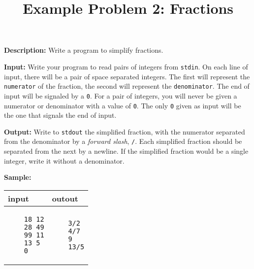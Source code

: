 \documentclass[a4paper]{article}
\title{Example Problem 2: Fractions}
\begin{document}
\lstset{
    language=java,
    basicstyle=\ttfamily,
    numbers=left,
    numbersep=8pt,
    showspaces=false,
    showstringspaces=false
}
\maketitle
\textbf{Description:} Write a program to simplify fractions.

\textbf{Input:} Write your program to read pairs of integers from \texttt{stdin}. On each line of input, there will be a pair of space separated integers. The first will represent the \texttt{numerator} of the fraction, the second will represent the \texttt{denominator}. The end of input will be signaled by a \texttt{0}. For a pair of integers, you will never be given a numerator or denominator with a value of \texttt{0}. The only \texttt{0} given as input will be the one that signals the end of input. 


\textbf{Output:} Write to \texttt{stdout} the simplified fraction, with the numerator separated from the denominator by a \textit{forward slash}, \texttt{/}. Each simplified fraction should be separated from the next by a newline. If the simplified fraction would be a single integer, write it without a denominator.  

\textbf{Sample:}

\begin{tabular}{|p{}|p{}|}
    \hline
    \textbf{input} & \textbf{outout} \\
    \hline
    \begin{verbatim}
    18 12
    28 49
    99 11
    13 5
    0
    \end{verbatim} &
    \begin{verbatim}
    3/2
    4/7
    9
    13/5
    \end{verbatim} \\
    \hline
\end{tabular}
\end{document}
